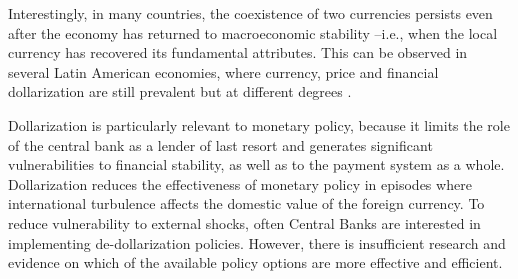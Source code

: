 Interestingly, in many countries, the coexistence of two currencies persists even after the economy has returned to macroeconomic stability --i.e., when the local currency has recovered its fundamental attributes. This can be observed in several Latin American economies, where currency, price and financial dollarization are still prevalent but at different degrees \citep{RePEc:imf:imfwpa:05/187, RePEc:eee:moneco:v:56:y:2009:i:3:p:295-308}.



Dollarization is particularly relevant to monetary policy, because it limits the role of the central bank as a lender of last resort and generates significant vulnerabilities to financial stability, as well as to the payment system as a whole. Dollarization reduces the effectiveness of monetary policy in episodes where international turbulence affects the domestic value of the foreign currency. 
To reduce vulnerability to external shocks, often Central Banks are interested in implementing de-dollarization policies. However, there is insufficient research and evidence on which of the available policy options are more effective and efficient. 

 



